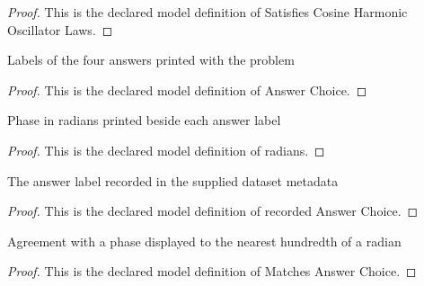 \begin{proof}
  This is the declared model definition of Satisfies Cosine Harmonic Oscillator Laws.
\end{proof}
\begin{definition}
  \label{def:physics:phyx-mini-0253:phyxminiproblems-problemphyxmini0253-answerchoice}
  Labels of the four answers printed with the problem
\end{definition}
\begin{proof}
  This is the declared model definition of Answer Choice.
\end{proof}
\begin{definition}[radians]
  \label{def:physics:phyx-mini-0253:phyxminiproblems-problemphyxmini0253-answerchoice-radians}
  Phase in radians printed beside each answer label
\end{definition}
\begin{proof}
  This is the declared model definition of radians.
\end{proof}
\begin{definition}
  \label{def:physics:phyx-mini-0253:phyxminiproblems-problemphyxmini0253-recordedanswerchoice}
  The answer label recorded in the supplied dataset metadata
\end{definition}
\begin{proof}
  This is the declared model definition of recorded Answer Choice.
\end{proof}
\begin{definition}
  \label{def:physics:phyx-mini-0253:phyxminiproblems-problemphyxmini0253-matchesanswerchoice}
  Agreement with a phase displayed to the nearest hundredth of a radian
\end{definition}
\begin{proof}
  This is the declared model definition of Matches Answer Choice.
\end{proof}
